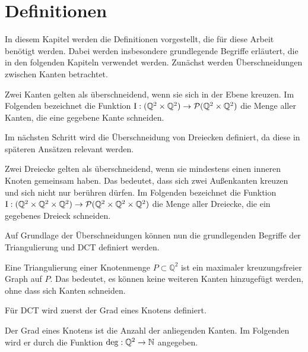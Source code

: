 \chapter{Definitionen}
In diesem Kapitel werden die Definitionen vorgestellt, die für diese Arbeit benötigt werden.
Dabei werden insbesondere grundlegende Begriffe erläutert, die in den folgenden Kapiteln verwendet werden.
Zunächst werden Überschneidungen zwischen Kanten betrachtet. 

\begin{definition}[Überschneidung]
    Zwei Kanten gelten als überschneidend, wenn sie sich in der Ebene kreuzen.
    Im Folgenden bezeichnet die Funktion \(\operatorname{I}: (\mathbb{Q}^2 \times \mathbb{Q}^2) \to \mathcal{P}(\mathbb{Q}^2 \times \mathbb{Q}^2)\) die Menge aller Kanten, die eine gegebene Kante schneiden.
\end{definition}


Im nächsten Schritt wird die Überschneidung von Dreiecken definiert, da diese in späteren Ansätzen relevant werden.
\begin{definition}
    Zwei Dreiecke gelten als überschneidend, wenn sie mindestens einen inneren Knoten gemeinsam haben.
    Das bedeutet, dass sich zwei Außenkanten kreuzen und sich nicht nur berühren dürfen.
    Im Folgenden bezeichnet die Funktion \(\operatorname{I}: (\mathbb{Q}^2 \times \mathbb{Q}^2 \times \mathbb{Q}^2) \to \mathcal{P}(\mathbb{Q}^2 \times \mathbb{Q}^2 \times \mathbb{Q}^2)\) die Menge aller Dreiecke, die ein gegebenes Dreieck schneiden.
\end{definition}

Auf Grundlage der Überschneidungen können nun die grundlegenden Begriffe der Triangulierung und DCT definiert werden.
\begin{definition}[Triangulierung]
    Eine Triangulierung einer Knotenmenge \(P \subset \mathbb{Q}^2\) ist ein maximaler kreuzungsfreier Graph auf \(P\).
    Das bedeutet, es können keine weiteren Kanten hinzugefügt werden, ohne dass sich Kanten schneiden.
\end{definition}

Für DCT wird zuerst der Grad eines Knotens definiert.

\begin{definition}[Grad]
    Der Grad eines Knotens ist die Anzahl der anliegenden Kanten.
    Im Folgenden wird er durch die Funktion \(\operatorname{deg}: \mathbb{Q}^2 \to \mathbb{N}\) angegeben.
\end{definition}


